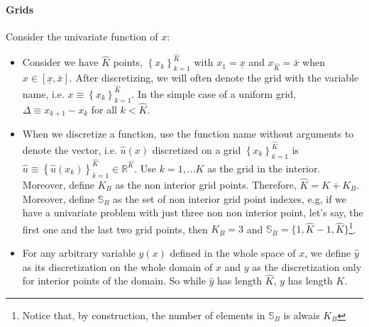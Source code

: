 \documentclass[11pt]{article}
\newcommand{\set}[1]{\ensuremath{\left\{{#1}\right\}}}
\newcommand{\R}{\ensuremath{\mathbb{R}}}
\begin{document}
	\paragraph{Grids}Consider the univariate function of $x$:
	\begin{itemize}
		\item Consider we have $\hat{K}$ points, $\set{x_k}_{k=1}^{\hat{K}}$ with $x_1 = \underline{x}$ and $x_{\hat{K}} = \bar{x}$ when $x \in [\underline{x}, \bar{x}]$. After discretizing, we will often denote the grid with the variable name, i.e. $x \equiv \set{x_k}_{k=1}^{\hat{K}}$. In the simple case of a uniform grid, $\Delta \equiv x_{k+1} - x_k$ for all $k < \hat{K}$.
		\item When we discretize a function, use the function name without arguments to denote the vector,  i.e. $\hat{u}(x)$ discretized on a grid $\set{x_k}_{k=1}^{\hat{K}}$  is $\hat{u} \equiv \set{\hat{u}(x_k)}_{k=1}^{\hat{K}} \in \R^{\hat{K}}$.
		Use $k=1,... K$ as the grid in the interior. Moreover, define $K_{B}$ as the non interior grid points. Therefore, $\hat{K} = K + K_{B}$. Moreover, define $\mathbb{S}_B$ as the set of non interior grid point indexes, e.g, if we have a univariate problem with just three non non interior point, let's say, the first one and the last two grid points, then $K_B = 3$ and $\mathbb{S}_B = \{1,\hat{K}-1,\hat{K}\}$\footnote{Notice that, by construction, the number of elements in $\mathbb{S}_B$ is alwais $K_B$}.		
		
		\item For any arbitrary variable $y(x)$ defined in the whole space of $x$, we define $\hat{y}$ as its discretization on the whole domain of $x$ and $y$ as the discretization only for interior points of the domain. So while $\hat{y}$ has length $\hat{K}$, $y$ has length $K$.
	\end{itemize}
	
\end{document}
